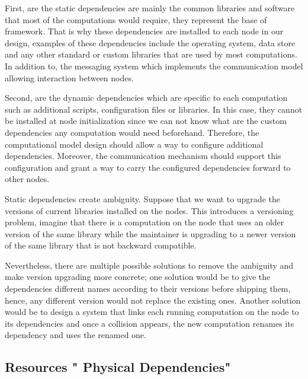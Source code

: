 First, are the static dependencies are mainly the common libraries and software that most of the computations would require, they represent the base of framework. That is why these dependencies are installed to each node in our design, examples of these dependencies include the operating system, data store and any other standard or custom libraries that are used by most computations.
 In addition to, the messaging system which implements the communication model allowing interaction between nodes. 

 Second, are the dynamic dependencies which are specific to each computation such as additional scripts, configuration files or libraries. In this case, they cannot be installed at node initialization since we can not know what are the custom dependencies any computation would need beforehand. Therefore, the computational model design should allow a way to configure additional dependencies. Moreover, the communication mechanism should support this configuration and grant a way to carry the configured dependencies forward to other nodes.
 
 
  Static dependencies create ambiguity. Suppose that we want to upgrade the versions of current libraries installed on the nodes. This introduces a  versioning problem, imagine that there is a computation on the node that uses an older version of the same library while the maintainer is upgrading to a newer version of the same library that is not backward compatible. 
  
   Nevertheless, there are multiple possible solutions to remove the ambiguity and make  version upgrading more concrete; one solution would be to give the dependencies different names according to their versions before shipping them, hence, any different version would not replace the existing ones. Another solution would be to design a system that links each running computation on the node to its dependencies and once a collision appears, the new computation renames its dependency and uses the renamed one.
 

\subsection {Resources " Physical Dependencies" }


